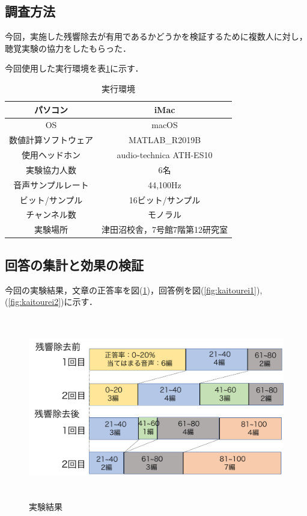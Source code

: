 \documentclass[a4j,11pt]{jsarticle}
\begin{document}
\subsection{調査方法}
今回，実施した残響除去が有用であるかどうかを検証するために複数人に対し，聴覚実験の協力をしたもらった．

今回使用した実行環境を表\ref{tab:use}に示す．

\begin{table}[htb]
\begin{center}

\caption{実行環境}
  \begin{tabular}{|c|c|} \hline
    パソコン & iMac  \\ \hline
    OS & macOS  \\ \hline
    数値計算ソフトウェア & MATLAB\_R2019B  \\ \hline
    使用ヘッドホン & audio-technica ATH-ES10  \\ \hline
    実験協力人数 & 6名  \\ \hline
    音声サンプルレート & 44,100Hz  \\ \hline
    ビット/サンプル & 16ビット/サンプル  \\ \hline
    チャンネル数 & モノラル  \\ \hline
    実験場所 & 津田沼校舎，7号館7階第12研究室\\ \hline
  \end{tabular}
  \label{tab:use}
  \end{center}
\end{table}

\newpage

\subsection{回答の集計と効果の検証}
今回の実験結果，文章の正答率を図(\ref{fig:shitsumonshi})，回答例を図(\ref{fig:kaitourei1}),(\ref{fig:kaitourei2})に示す．



\begin{figure}[h]
\begin{center}
 \includegraphics[clip,width=130mm,height=80mm]{shitsumonkekka.pdf}
\end{center}
 \caption{実験結果}
 \label{fig:shitsumonshi}
\end{figure}
 
\end{document}
